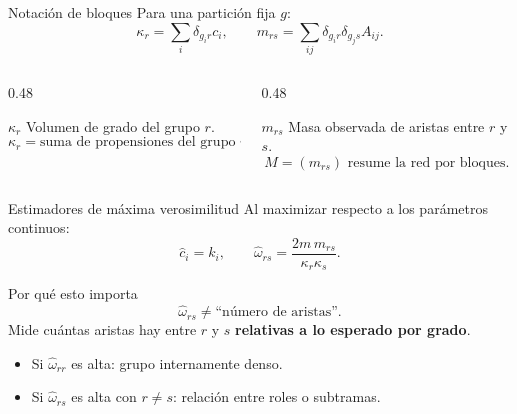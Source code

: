 \documentclass[aspectratio=169,11pt]{beamer}
\newcommand{\what}{\hat\omega}
\begin{document}
\begin{frame}{Notación de bloques}
Para una partición fija $g$:
\[
\kappa_r=\sum_i\delta_{g_i r}c_i,
\qquad
m_{rs}=\sum_{ij}\delta_{g_i r}\delta_{g_j s}A_{ij}.
\]

\vspace{0.25cm}

\begin{columns}[T,totalwidth=\textwidth]
\begin{column}{0.48\textwidth}
\begin{block}{$\kappa_r$}
Volumen de grado del grupo $r$.
\[
\kappa_r=\text{suma de propensiones del grupo }r.
\]
\end{block}
\end{column}
\begin{column}{0.48\textwidth}
\begin{block}{$m_{rs}$}
Masa observada de aristas entre $r$ y $s$.
\[
M=(m_{rs}) \text{ resume la red por bloques.}
\]
\end{block}
\end{column}
\end{columns}
\end{frame}

\begin{frame}{Estimadores de máxima verosimilitud}
Al maximizar respecto a los parámetros continuos:
\[
\hat c_i=k_i,
\qquad
\what_{rs}=\frac{2m\,m_{rs}}{\kappa_r\kappa_s}.
\]

\vspace{0.3cm}

\begin{alertblock}{Por qué esto importa}
\[
\what_{rs}
\neq
\text{``número de aristas''}.
\]
Mide cuántas aristas hay entre $r$ y $s$ \textbf{relativas a lo esperado por grado}.
\end{alertblock}

\begin{itemize}
    \item Si $\what_{rr}$ es alta: grupo internamente denso.
    \item Si $\what_{rs}$ es alta con $r\neq s$: relación entre roles o subtramas.
\end{itemize}
\end{frame}
\end{document}
